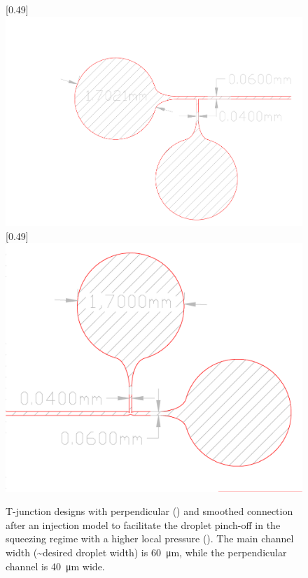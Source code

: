 	\begin{figure}[h]
			\centering
			[0.49\linewidth]{
			\includegraphics[clip,trim={50mm 5mm 0mm 40mm},scale=.30]{Ressourcen/IMG/Microfluidics_Prototype_3_2018412-t_Junction_perp}
			}
		\hfil
			[0.49\linewidth]{
		\includegraphics[clip,trim={10mm 10mm 0mm 0mm},scale=.3]{Ressourcen/AutoCAD/T-junction_complete_round}
		}
\caption{T-junction designs with perpendicular (\protect{}) and smoothed connection after an injection model to facilitate the droplet pinch-off in the squeezing regime with a higher local pressure (\protect{}). The main channel width (\textasciitilde desired droplet width) is \SI{60}{\micro\meter}, while the perpendicular channel is \SI{40}{\micro\meter} wide.}
\label{fig:CAD:t}
\end{figure}
\newpage

